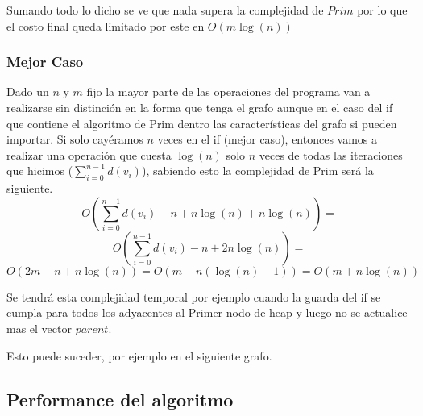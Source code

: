 Sumando todo lo dicho se ve que nada supera la complejidad de $Prim$ por lo que el costo final queda limitado por este en $O(m \log(n))$

\subsubsection{Mejor Caso}

Dado un $n$ y $m$ fijo la mayor parte de las operaciones del programa van a realizarse sin distinción en la forma que tenga el grafo aunque en el caso del if que contiene el algoritmo de Prim dentro las características del grafo si pueden importar. Si solo cay\'eramos $n$ veces en el if (mejor caso), entonces vamos a realizar una operación que cuesta $\log(n)$ solo $n$ veces de todas las iteraciones que hicimos ($\sum_{i=0}^{n-1}d(v_{i})$), sabiendo esto la complejidad de Prim será la siguiente.
	$$O( \sum_{i=0}^{n-1}d(v_{i}) - n + n \log(n) + n \log(n) ) = $$
	$$O( \sum_{i=0}^{n-1}d(v_{i}) - n + 2n \log(n) ) = $$
	$$O( 2m - n + n \log(n) ) = O( m + n (\log(n)-1) ) = O( m + n \log(n)) $$

Se tendrá esta complejidad temporal por ejemplo cuando la guarda del if se cumpla para todos los adyacentes al Primer nodo de heap y luego no se actualice mas el vector $parent$.

Esto puede suceder, por ejemplo en el siguiente grafo.
	
\begin{figure}[H]
\centering
%
\end{figure}

\subsection{Performance del algoritmo}

